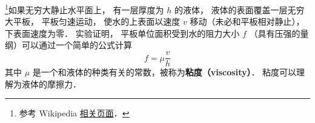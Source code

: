 
\begin{issues}
\issueDraft
\end{issues}

\footnote{参考 Wikipedia \href{https://en.wikipedia.org/wiki/Viscosity#Dynamic_and_kinematic_viscosity}{相关页面}．}如果无穷大静止水平面上， 有一层厚度为 $h$ 的液体， 液体的表面覆盖一层无穷大平板， 平板匀速运动， 使水的上表面以速度 $v$ 移动（未必和平板相对静止）， 下表面速度为零． 实验证明， 平板单位面积受到水的阻力大小 $f$ （具有压强的量纲）可以通过一个简单的公式计算
\begin{equation}
f = \mu \frac{v}{h}
\end{equation}
其中 $\mu$ 是一个和液体的种类有关的常数，被称为\textbf{粘度（viscosity）}． 粘度可以理解为液体的摩擦力．
